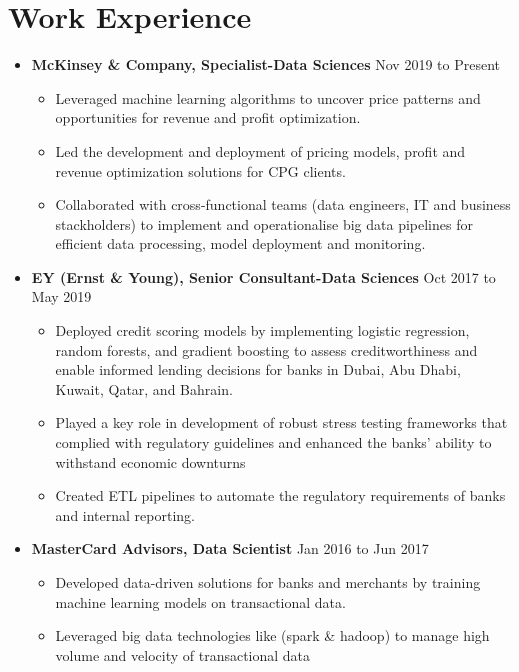 \documentclass[a4paper,10pt]{article}
\begin{document}
\section*{Work Experience}
\begin{itemize}[leftmargin=0.2cm, label={}]
    \item \textbf{McKinsey \& Company, Specialist-Data Sciences} \hfill \textnormal{Nov 2019 to Present}
    \begin{itemize}[leftmargin=0.5cm, label={\textbullet}]
        \item Leveraged machine learning algorithms to uncover price patterns and opportunities for revenue and profit optimization.
        \item Led the development and deployment of pricing models, profit and revenue optimization solutions for CPG clients.
        \item Collaborated with cross-functional teams (data engineers, IT and business stackholders) to implement and operationalise big data pipelines for efficient data processing, model deployment and monitoring.
    \end{itemize}
    
    \item \textbf{EY (Ernst \& Young), Senior Consultant-Data Sciences} \hfill \textnormal{Oct 2017 to May 2019}
    \begin{itemize}[leftmargin=0.5cm, label={\textbullet}]
        \item Deployed credit scoring models by implementing logistic regression, random forests, and gradient boosting to assess creditworthiness and enable informed lending decisions for banks in Dubai, Abu Dhabi, Kuwait, Qatar, and Bahrain.
        \item Played a key role in development of robust stress testing frameworks that complied with regulatory guidelines and enhanced the banks' ability to withstand economic downturns
        \item Created ETL pipelines to automate the regulatory requirements of banks and internal reporting.
    \end{itemize}
    
    \item \textbf{MasterCard Advisors, Data Scientist} \hfill \textnormal{Jan 2016 to Jun 2017}
    \begin{itemize}[leftmargin=0.5cm, label={\textbullet}]
        \item Developed data-driven solutions for banks and merchants by training machine learning models on transactional data.
        \item Leveraged big data technologies like (spark \& hadoop) to manage high volume and velocity of transactional data
    \end{itemize}
    

\end{itemize}
\end{document}
